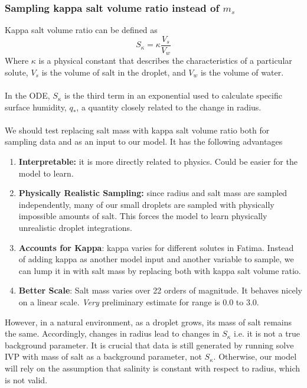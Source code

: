 \documentclass{article}
\begin{document}
\subsubsection{Sampling kappa salt volume ratio instead of $m_s$}
Kappa salt volume ratio can be defined as
\[
	S_\kappa = \kappa\frac{V_{s}}{V_{w}}
\]
Where $\kappa$ is a physical constant that describes the characteristics of a particular solute, $V_s$ is the volume of salt in the droplet, and $V_w$ is the volume of water.\\\\
In the ODE, $S_\kappa$ is the third term in an exponential used to calculate specific surface humidity, $q_*$, a quantity closely related to the change in radius.\\\\
We should test replacing salt mass with kappa salt volume ratio both for sampling data and as an input to our model. It has the following advantages
\begin{enumerate}
	\item \textbf{Interpretable:} it is more directly related to physics. Could be easier for the model to learn.
	\item \textbf{Physically Realistic Sampling:} since radius and salt mass are sampled independently, many of our small droplets are sampled with physically impossible amounts of salt. This forces the model to learn physically unrealistic droplet integrations.
	\item \textbf{Accounts for Kappa}: kappa varies for different solutes in Fatima. Instead of adding kappa as another model input and another variable to sample, we can lump it in with salt mass by replacing both with kappa salt volume ratio.
	\item \textbf{Better Scale}: Salt mass varies over 22 orders of magnitude. It behaves nicely on a linear scale. \textit{Very} preliminary estimate for range is 0.0 to 3.0.
\end{enumerate}
However, in a natural environment, as a droplet grows, its mass of salt remains the same. Accordingly, changes in radius lead to changes in $S_\kappa$ i.e. it is not a true background parameter. It is crucial that data is still generated by running solve IVP with mass of salt as a background parameter, not $S_\kappa$. Otherwise, our model will rely on the assumption that salinity is constant with respect to radius, which is not valid.
\end{document}

